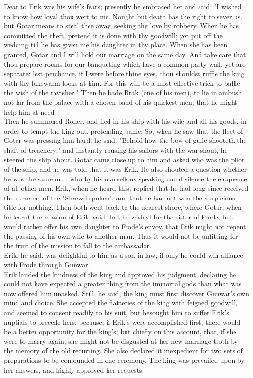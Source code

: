 \documentclass[10pt,a4paper]{report}
\begin{document}
Dear to Erik was his wife's fears; presently he embraced her and said: "I wished to know how loyal thou wert to me. Nought but death has the right to sever us, but Gotar means to steal thee away, seeking thy love by robbery. When he has committed the theft, pretend it is done with thy goodwill; yet put off the wedding till he has given me his daughter in thy place. When she has been granted, Gotar and I will hold our marriage on the same day. And take care that thou prepare rooms for our banqueting which have a common party-wall, yet are separate: lest perchance, if I were before thine eyes, thou shouldst ruffle the king with thy lukewarm looks at him. For this will be a most effective trick to baffle the wish of the ravisher." Then he bade Brak (one of his men), to lie in ambush not far from the palace with a chosen band of his quickest men, that he might help him at need.\\

Then he summoned Roller, and fled in his ship with his wife and all his goods, in order to tempt the king out, pretending panic: So, when he saw that the fleet of Gotar was pressing him hard, he said: "Behold how the bow of guile shooteth the shaft of treachery;" and instantly rousing his sailors with the war-shout, he steered the ship about. Gotar came close up to him and asked who was the pilot of the ship, and he was told that it was Erik. He also shouted a question whether he was the same man who by his marvellous speaking could silence the eloquence of all other men. Erik, when he heard this, replied that he had long since received the surname of the "Shrewd-spoken", and that he had not won the auspicious title for nothing. Then both went back to the nearest shore, where Gotar, when he learnt the mission of Erik, said that he wished for the sister of Frode, but would rather offer his own daughter to Frode's envoy, that Erik might not repent the passing of his own wife to another man. Thus it would not be unfitting for the fruit of the mission to fall to the ambassador.\\

Erik, he said, was delightful to him as a son-in-law, if only he could win alliance with Frode through Gunwar.\\

Erik lauded the kindness of the king and approved his judgment, declaring he could not have expected a greater thing from the immortal gods than what was now offered him unasked. Still, he said, the king must first discover Gunwar's own mind and choice. She accepted the flatteries of the king with feigned goodwill, and seemed to consent readily to his suit, but besought him to suffer Erik's nuptials to precede hers; because, if Erik's were accomplished first, there would be a better opportunity for the king's; but chiefly on this account, that, if she were to marry again, she might not be disgusted at her new marriage troth by the memory of the old recurring. She also declared it inexpedient for two sets of preparations to be confounded in one ceremony. The king was prevailed upon by her answers, and highly approved her requests.\\
\end{document}
